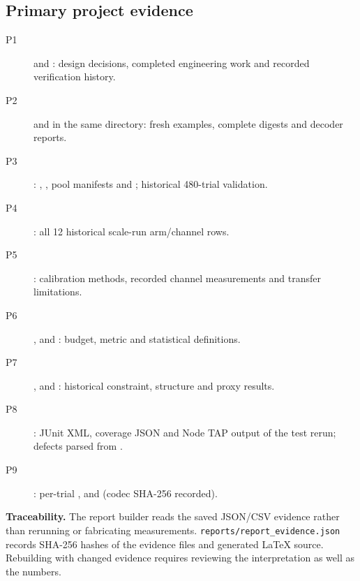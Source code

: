 \documentclass[11pt,a4paper]{article}
\newcommand{\note}[1]{\par\noindent\colorbox{light}{\parbox{\dimexpr\linewidth-2\fboxsep\relax}{\small #1}}\par}
\begin{document}
\subsection*{Primary project evidence}
{\small\begin{description}
\item[P1]  and : design decisions,
  completed engineering work and recorded verification history.
\item[P2]  and 
  in the same directory: fresh examples, complete digests and decoder reports.
\item[P3] : ,
  , pool manifests and ; historical 480-trial validation.
\item[P4] : all 12
  historical scale-run arm/channel rows.
\item[P5] : calibration methods, recorded
  channel measurements and transfer limitations.
\item[P6] ,  and
  : budget, metric and statistical definitions.
\item[P7] , 
  and : historical constraint, structure and proxy results.
\item[P8] : JUnit XML, coverage JSON and Node TAP output of
  the test rerun; defects parsed from .
\item[P9] : per-trial ,
   and  (codec SHA-256 recorded).
\end{description}}
\note{\textbf{Traceability.} The report builder reads the saved JSON/CSV evidence rather
than rerunning or fabricating measurements. \texttt{reports/report\_evidence.json}
records SHA-256 hashes of the evidence files and generated LaTeX source. Rebuilding with
changed evidence requires reviewing the interpretation as well as the numbers.}
\end{document}

